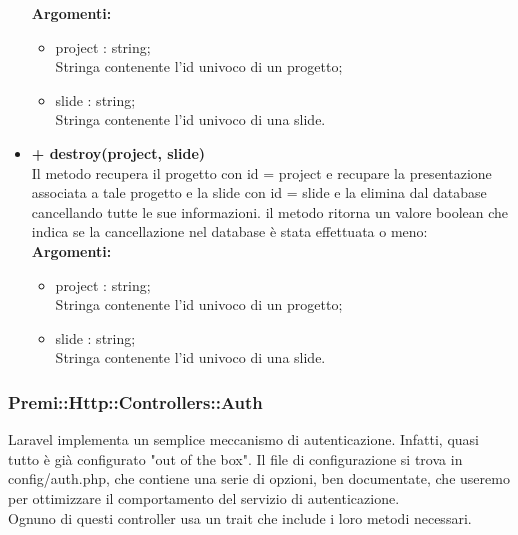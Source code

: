 \begin{itemize}
					\textbf{Argomenti:}
					\begin{itemize}
						\item project : string; \\
						Stringa contenente l'id univoco di un progetto;
						\item slide : string;\\
						Stringa contenente l'id univoco di una slide.
					\end{itemize}
			\item \textbf{+ destroy(project, slide)}\\
				Il metodo recupera il progetto con id = project e recupare la presentazione associata a tale progetto e la slide con id = slide e la elimina dal database cancellando tutte le sue informazioni. il metodo ritorna un valore boolean che indica se la cancellazione nel database è stata effettuata o meno:\\
				\textbf{Argomenti:}
				\begin{itemize}
					\item project : string; \\
					Stringa contenente l'id univoco di un progetto;
					\item slide : string;\\
					Stringa contenente l'id univoco di una slide.
				\end{itemize}
\end{itemize}

\newpage
\subsubsection{Premi::Http::Controllers::Auth}
Laravel implementa un semplice meccanismo di autenticazione. Infatti, quasi tutto è già configurato "out of the box". Il file di configurazione si trova in config/auth.php, che contiene una serie di opzioni, ben documentate, che useremo per ottimizzare il comportamento del servizio di autenticazione.\\
Ognuno di questi controller usa un trait che include i loro metodi necessari.
